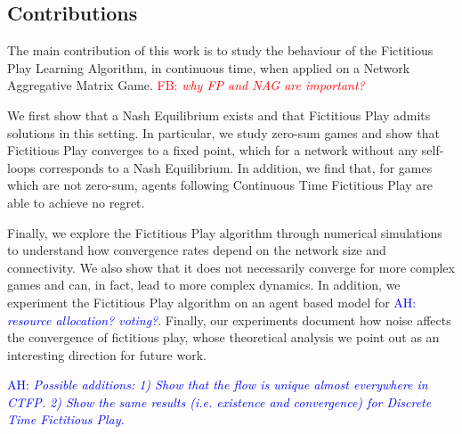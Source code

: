\documentclass{article}
\theoremstyle{definition}
\newcommand{\ah}[1]{\textcolor{blue}{AH: \textit{#1}}}
\newcommand{\fb}[1]{\textcolor{red}{FB: \textit{#1}}}
\begin{document}
	\subsection{Contributions}

		The main contribution of this work is to study the
                behaviour of the Fictitious Play Learning Algorithm,
                in continuous time, when applied on a Network
                Aggregative Matrix Game.
\fb{why FP and NAG are important?}


                We first show that a Nash
                Equilibrium exists and that Fictitious Play admits
                solutions in this setting. In particular, we study
                zero-sum games and show that Fictitious Play converges
                to a fixed point, which for a network without any self-loops
                corresponds to a Nash Equilibrium. In addition, we
                find that, for games which are not zero-sum, agents
                following Continuous Time Fictitious Play are able to
                achieve no regret.

		Finally, we explore the Fictitious Play algorithm
                through numerical simulations to understand how
                convergence rates depend on the network size and
                connectivity. We also show that it does not
                necessarily converge for more complex games and can,
                in fact, lead to more complex dynamics. In addition,
                we experiment the Fictitious Play algorithm on an
                agent based model for \ah{resource allocation? 
                voting?}. Finally, our experiments document how noise
                affects the convergence of fictitious play, whose
                theoretical analysis we point out as an interesting
                direction for future work.

		\ah{Possible additions: 1) Show that the flow is
                  unique almost everywhere in CTFP. 2) Show the same
                  results (i.e. existence and convergence) for
                  Discrete Time Fictitious Play.}
\end{document}
